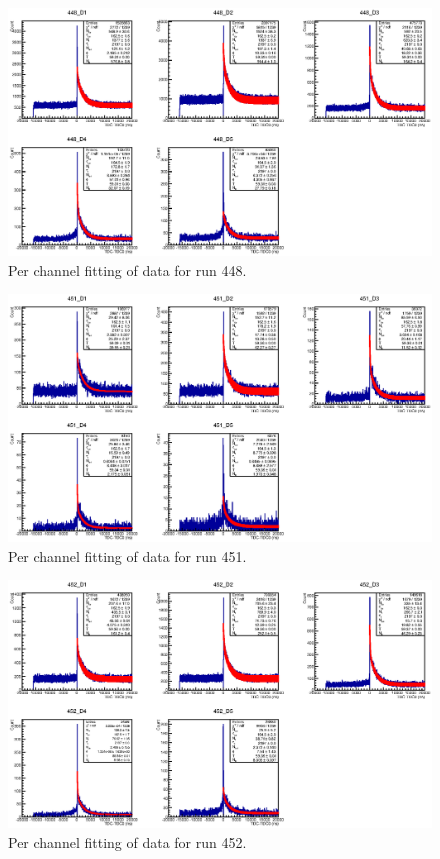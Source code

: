 \begin{figure}[hptb] 
  \centering
    \includegraphics[scale=1.1, angle=90]{images/momentum_spectrum/448.eps}
  \caption{Per channel fitting of data for run 448.}
  \label{fig:images_momentum_spectrum_448}
\end{figure}
\begin{figure}[hptb] 
  \centering
    \includegraphics[scale=1.1, angle=90]{images/momentum_spectrum/451.eps}
  \caption{Per channel fitting of data for run 451.}
  \label{fig:images_momentum_spectrum_451}
\end{figure}
\begin{figure}[hptb] 
  \centering
    \includegraphics[scale=1.1, angle=90]{images/momentum_spectrum/452.eps}
  \caption{Per channel fitting of data for run 452.}
  \label{fig:images_momentum_spectrum_452}
\end{figure}
